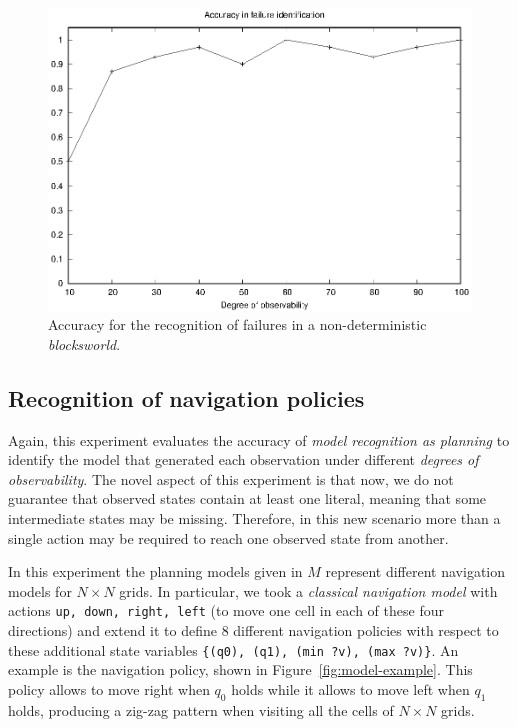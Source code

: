 \documentclass[letterpaper]{article} %
\begin{document}
\begin{figure}
	\centering
	\includegraphics[width=0.9\linewidth]{figures/blocks.eps}
	\caption{Accuracy for the recognition of failures in a non-deterministic {\em blocksworld}.}
	\label{fig:blocks_acc}
\end{figure}



\subsection{Recognition of navigation policies}
Again, this experiment evaluates the accuracy of {\em model recognition as planning} to identify the model that generated each observation under different {\em degrees of observability}. The novel aspect of this experiment is that now, we do not guarantee that observed states contain at least one literal, meaning that some intermediate states may be missing. Therefore, in this new scenario more than a single action may be required to reach one observed state from another.

In this experiment the planning models given in $M$ represent different navigation models for $N\times N$ grids. In particular, we took a {\em classical navigation model} with actions {\tt\small up, down, right, left} (to move one cell in each of these four directions) and extend it to define 8 different navigation policies with respect to these additional state variables {\tt\small \{(q0), (q1), (min ?v), (max ?v)\}}. An example is the navigation policy, shown in Figure~\ref{fig:model-example}. This policy allows to move right when $q_0$ holds while it allows to move left when $q_1$ holds, producing a zig-zag pattern when visiting all the cells of $N\times N$ grids.
\end{document}
